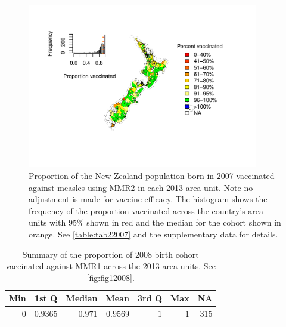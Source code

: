 \documentclass{article}
\begin{document}
\begin{figure}
\begin{center}
    \includegraphics[width=0.9\textwidth]{nir_census_MMR2_NIR_2007.pdf}
\end{center}
    \caption{Proportion of the New Zealand population born in 2007 vaccinated against measles using MMR2 in each 2013 area unit. Note no adjustment is made for vaccine efficacy. The histogram shows the frequency of the proportion vaccinated across the country's area units with 95\% shown in red and the median for the cohort shown in orange. See \autoref{table:tab22007} and the supplementary data for details.}
\label{fig:fig22007}
\end{figure}

 \vspace{5mm} %
\begin{table}
\begin{center}
\begin{tabular}{rrrrrrr}
\hline\hline
\multicolumn{1}{c}{Min}&\multicolumn{1}{c}{1st Q}&\multicolumn{1}{c}{Median}&\multicolumn{1}{c}{Mean}&\multicolumn{1}{c}{3rd Q}&\multicolumn{1}{c}{Max}&\multicolumn{1}{c}{NA}\tabularnewline
\hline
$0$&$0.9365$&$0.971$&$0.9569$&$1$&$1$&$315$\tabularnewline
\hline
\end{tabular}\end{center}\caption{Summary of the proportion of 2008 birth cohort vaccinated against MMR1 across the 2013 area units. See \autoref{fig:fig12008}.}
\label{table:tab12008}
\end{table}
\end{document}
